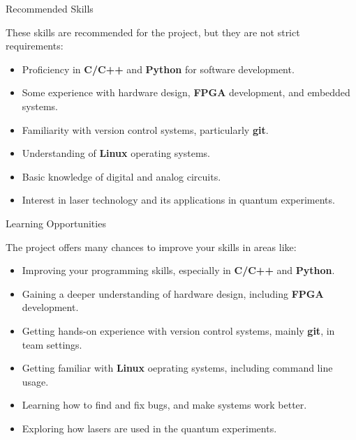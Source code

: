 \documentclass{project-proposal}
\begin{document}
\begin{sectiontwocolumns}
    {Recommended Skills}
    {
        These skills are recommended for the project, but they are not strict
        requirements:

        \begin{itemize}
            \item {Proficiency in \textbf{C/C++} and \textbf{Python} for software development.}
            \item {Some experience with hardware design, \textbf{FPGA} development, and embedded systems.}
            \item {Familiarity with version control systems, particularly \textbf{git}.}
            \item {Understanding of \textbf{Linux} operating systems.}
            \item {Basic knowledge of digital and analog circuits.}
            \item {Interest in laser technology and its applications in quantum experiments.}
        \end{itemize}
    }
    {Learning Opportunities}
    {
        The project offers many chances to improve your skills in areas like:

        \begin{itemize}
            \item {Improving your programming skills, especially in \textbf{C/C++} and \textbf{Python}.}
            \item {Gaining a deeper understanding of hardware design, including \textbf{FPGA} development.}
            \item {Getting hands-on experience with version control systems, mainly  \textbf{git}, in team settings.}
            \item {Getting familiar with \textbf{Linux} oeprating systems, including command line usage.}
            \item {Learning how to find and fix bugs, and make systems work better.}
            \item {Exploring how lasers are used in the quantum experiments.}
        \end{itemize}
    }
\end{sectiontwocolumns}
\end{document}
